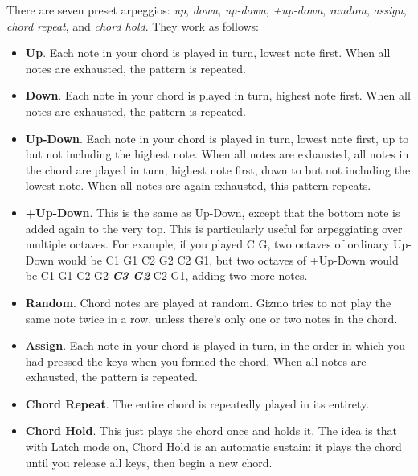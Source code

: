 \documentclass{article}
\begin{document}
There are seven preset arpeggios: {\it up}, {\it down}, {\it up-down}, {\it  +up-down}, {\it random}, {\it assign}, {\it chord repeat}, and {\it chord hold}.  They work as follows:

\begin{itemize}
\item {\bf Up}.  Each note in your chord is played in turn, lowest note first.  When all notes are exhausted, the pattern is repeated.
\end{itemize}

\begin{itemize}
\item {\bf Down}.  Each note in your chord is played in turn, highest note first.  When all notes are exhausted, the pattern is repeated.
\item {\bf Up-Down}.  Each note in your chord is played in turn, lowest note first, up to but not including the highest note.  When all notes are exhausted, all notes in the chord are played in turn, highest note first, down to but not including the lowest note.  When all notes are again exhausted, this pattern repeats.
\item {\bf  +Up-Down}.  This is the same as Up-Down, except that the bottom note is added again to the very top.  This is particularly useful for arpeggiating over multiple octaves.  For example, if you played C G, two octaves of ordinary Up-Down would be C1 G1 C2 G2 C2 G1, but two octaves of +Up-Down would be C1 G1 C2 G2 \textit{\textbf{C3 G2}} C2 G1, adding two more notes.  
\item {\bf Random}.  Chord notes are played at random.  Gizmo tries to not play the same note twice in a row, unless there's only one or two notes in the chord.
\item {\bf Assign}. Each note in your chord is played in turn, in the order in which you had pressed the keys when you formed the chord.  When all notes are exhausted, the pattern is repeated.
\item {\bf Chord Repeat}.  The entire chord is repeatedly played in its entirety.
\item {\bf Chord Hold}.  This just plays the chord once and holds it.  The idea is that with Latch mode on, Chord Hold is an automatic sustain: it plays the chord until you release all keys, then begin a new chord.
  
\end{itemize}
\end{document}
